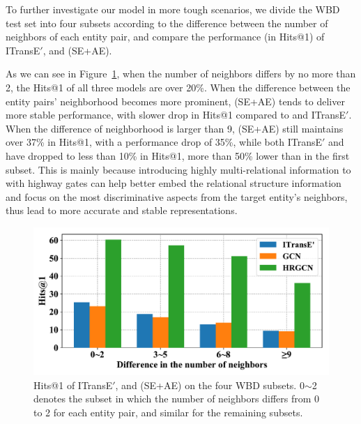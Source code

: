 To further investigate our model in more tough scenarios, %
we divide the WBD test set into four subsets according to the difference between the number of neighbors of each entity pair, and compare the performance (in Hits@1) of ITransE$'$, \GCN and \HRGCN (SE+AE). %

As we can see in Figure~\ref{subset}, when the number of neighbors differs by no more than 2, the Hits@1 of all three models are over 20\%.
When the difference between the entity pairs' neighborhood becomes more prominent,
\HRGCN (SE+AE) tends to deliver more stable performance, with slower drop in Hits@1 compared to \GCN and ITransE$'$.
When the difference of neighborhood is larger than 9, \HRGCN (SE+AE) still maintains over 37\% in Hits@1, with a performance drop of 35\%, while both ITransE$'$ and \GCN have dropped to less than 10\% in Hits@1, more than 50\% lower than in the first subset.
This is mainly because introducing highly multi-relational information to \GCN with highway gates can help better embed the relational structure information and focus on the most discriminative aspects from the target entity's neighbors, thus lead to more accurate and stable representations.
\begin{figure}
	\centering
	\includegraphics[width=1\linewidth]{figures/graph4.pdf}
	\caption{Hits@1 of ITransE$'$, \GCN and \HRGCN (SE+AE) on the four WBD subsets. 0$\sim$2 denotes the subset in which the number of neighbors differs from 0 to 2 for each entity pair, and similar for the remaining subsets.}
	\label{subset}
\end{figure}

